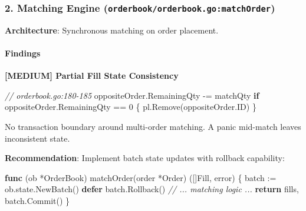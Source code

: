 \documentclass[
]{article}
\newenvironment{Shaded}{}{}
\newcommand{\CommentTok}[1]{\textcolor[rgb]{0.38,0.63,0.69}{\textit{#1}}}
\newcommand{\ControlFlowTok}[1]{\textcolor[rgb]{0.00,0.44,0.13}{\textbf{#1}}}
\newcommand{\DataTypeTok}[1]{\textcolor[rgb]{0.56,0.13,0.00}{#1}}
\newcommand{\DecValTok}[1]{\textcolor[rgb]{0.25,0.63,0.44}{#1}}
\newcommand{\KeywordTok}[1]{\textcolor[rgb]{0.00,0.44,0.13}{\textbf{#1}}}
\newcommand{\NormalTok}[1]{#1}
\newcommand{\OperatorTok}[1]{\textcolor[rgb]{0.40,0.40,0.40}{#1}}
\begin{document}
\subsubsection{\texorpdfstring{2. Matching Engine
(\texttt{orderbook/orderbook.go:matchOrder})}{2. Matching Engine (orderbook/orderbook.go:matchOrder)}}\label{2-matching-engine-orderbookorderbookgomatchorder}

\textbf{Architecture}: Synchronous matching on order placement.

\paragraph{Findings}\label{findings-1}

\textbf{{[}MEDIUM{]} Partial Fill State Consistency}

\begin{Shaded}
\begin{Highlighting}[]
\CommentTok{// orderbook.go:180{-}185}
\NormalTok{oppositeOrder}\OperatorTok{.}\NormalTok{RemainingQty }\OperatorTok{{-}=}\NormalTok{ matchQty}
\ControlFlowTok{if}\NormalTok{ oppositeOrder}\OperatorTok{.}\NormalTok{RemainingQty }\OperatorTok{==} \DecValTok{0} \OperatorTok{\{}
\NormalTok{    pl}\OperatorTok{.}\NormalTok{Remove}\OperatorTok{(}\NormalTok{oppositeOrder}\OperatorTok{.}\NormalTok{ID}\OperatorTok{)}
\OperatorTok{\}}
\end{Highlighting}
\end{Shaded}

No transaction boundary around multi-order matching. A panic mid-match
leaves inconsistent state.

\textbf{Recommendation}: Implement batch state updates with rollback
capability:

\begin{Shaded}
\begin{Highlighting}[]
\KeywordTok{func} \OperatorTok{(}\NormalTok{ob }\OperatorTok{*}\NormalTok{OrderBook}\OperatorTok{)}\NormalTok{ matchOrder}\OperatorTok{(}\NormalTok{order }\OperatorTok{*}\NormalTok{Order}\OperatorTok{)} \OperatorTok{([]}\NormalTok{Fill}\OperatorTok{,} \DataTypeTok{error}\OperatorTok{)} \OperatorTok{\{}
\NormalTok{    batch }\OperatorTok{:=}\NormalTok{ ob}\OperatorTok{.}\NormalTok{state}\OperatorTok{.}\NormalTok{NewBatch}\OperatorTok{()}
    \ControlFlowTok{defer}\NormalTok{ batch}\OperatorTok{.}\NormalTok{Rollback}\OperatorTok{()}
    \CommentTok{// ... matching logic ...}
    \ControlFlowTok{return}\NormalTok{ fills}\OperatorTok{,}\NormalTok{ batch}\OperatorTok{.}\NormalTok{Commit}\OperatorTok{()}
\OperatorTok{\}}
\end{Highlighting}
\end{Shaded}
\end{document}
